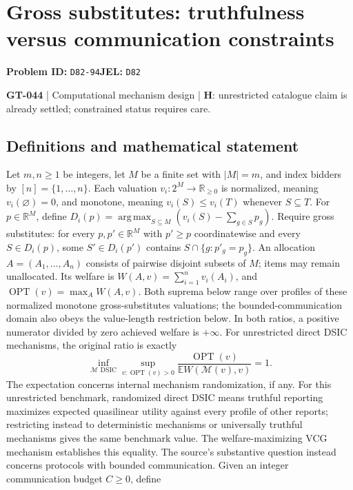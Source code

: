 \documentclass[11pt,a4paper]{article}
\begin{document}
\section*{Gross substitutes: truthfulness versus communication constraints}
\textbf{Problem ID:} \texttt{D82-94}\quad \textbf{JEL:} \texttt{D82}\par
\label{problem:OP-0174}
\label{game:GT-044}
{\sffamily\small\color{muted}
\textbf{GT-044} | Computational mechanism design | \textbf{H}: unrestricted catalogue claim is already settled; constrained status requires care.
\par}
\subsection*{Definitions and mathematical statement}
Let $m,n\geq1$ be integers, let $M$ be a finite set with $|M|=m$, and index bidders by $[n]=\{1,\ldots,n\}$. Each valuation $v_i:2^M\to\mathbb R_{\geq0}$ is normalized, meaning $v_i(\varnothing)=0$, and monotone, meaning $v_i(S)\leq v_i(T)$ whenever $S\subseteq T$. For $p\in\mathbb R^M$, define $D_i(p)=\operatorname*{arg\,max}_{S\subseteq M}(v_i(S)-\sum_{g\in S}p_g)$. Require gross substitutes: for every $p,p'\in\mathbb R^M$ with $p'\geq p$ coordinatewise and every $S\in D_i(p)$, some $S'\in D_i(p')$ contains $S\cap\{g:p'_g=p_g\}$. An allocation $A=(A_1,\ldots,A_n)$ consists of pairwise disjoint subsets of $M$; items may remain unallocated. Its welfare is $W(A,v)=\sum_{i=1}^n v_i(A_i)$, and $\operatorname{OPT}(v)=\max_A W(A,v)$. Both suprema below range over profiles of these normalized monotone gross-substitutes valuations; the bounded-communication domain also obeys the value-length restriction below. In both ratios, a positive numerator divided by zero achieved welfare is $+\infty$.
For unrestricted direct DSIC mechanisms, the original ratio is exactly
\[
 \inf_{\mathcal M\text{ DSIC}}\sup_{v:\operatorname{OPT}(v)>0}
 \frac{\operatorname{OPT}(v)}{\mathbb E W(\mathcal M(v),v)}=1.
\]
The expectation concerns internal mechanism randomization, if any. For this unrestricted benchmark, randomized direct DSIC means truthful reporting maximizes expected quasilinear utility against every profile of other reports; restricting instead to deterministic mechanisms or universally truthful mechanisms gives the same benchmark value.
The welfare-maximizing VCG mechanism establishes this equality. The source's substantive question instead concerns protocols with bounded communication. Given an integer communication budget $C\geq0$, define
\end{document}
